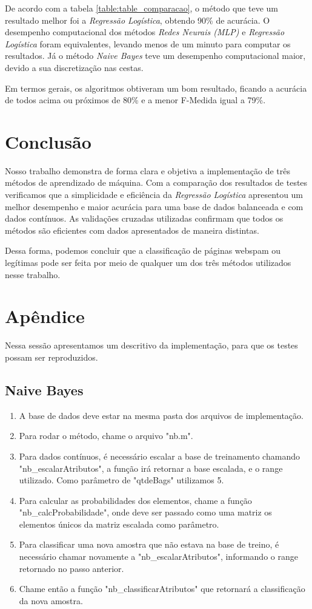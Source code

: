 \documentclass[10pt, conference, compsocconf]{IEEEtran}
\begin{document}
De acordo com a tabela \ref{table:table_comparacao}, o método que teve um resultado melhor foi a \textit{Regressão Logística}, obtendo 90\% de acurácia. O desempenho computacional dos métodos \textit{Redes Neurais (MLP)}  e \textit{Regressão Logística} foram equivalentes, levando menos de um minuto para computar os resultados. Já o método \textit{Naive Bayes} teve um desempenho computacional maior, devido a sua discretização nas cestas.

Em termos gerais, os algoritmos obtiveram um bom resultado, ficando a acurácia de todos acima ou próximos de 80\% e a menor F-Medida igual a 79\%.


\section{Conclusão}\label{conclusao}
Nosso trabalho demonstra de forma clara e objetiva a implementação de três métodos de aprendizado de máquina. Com a comparação dos resultados de testes verificamos que a simplicidade e eficiência da \textit{Regressão Logística} apresentou um melhor desempenho e maior acurácia para uma base de dados balanceada e com dados contínuos. As validações cruzadas utilizadas confirmam que todos os métodos são eficientes com dados apresentados de maneira distintas.

Dessa forma, podemos concluir que a classificação de páginas webspam ou legítimas pode ser feita por meio de qualquer um dos três métodos utilizados nesse trabalho.





\newpage
\section{Apêndice}
Nessa sessão apresentamos um descritivo da implementação, para que os testes possam ser reproduzidos.

\subsection{Naive Bayes}
\begin{enumerate}
\item A base de dados deve estar na mesma pasta dos arquivos de implementação.
\item Para rodar o método, chame o arquivo "nb.m".
\item Para dados contínuos, é necessário escalar a base de treinamento chamando "nb\_escalarAtributos", a função irá retornar a base escalada, e o range utilizado. Como parâmetro de "qtdeBags" utilizamos 5.
\item Para calcular as probabilidades dos elementos, chame a função "nb\_calcProbabilidade", onde deve ser passado como uma matriz os elementos únicos da matriz escalada como parâmetro.
\item Para classificar uma nova amostra que não estava na base de treino, é necessário chamar novamente a "nb\_escalarAtributos", informando o range retornado no passo anterior.
\item Chame então a função "nb\_classificarAtributos" que retornará a classificação da nova amostra.
\end{enumerate}
\end{document}
